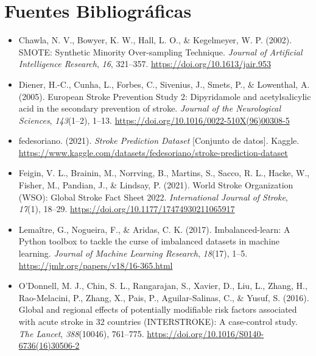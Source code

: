 \documentclass[12pt,a4paper]{article}
\begin{document}
\section{Fuentes Bibliográficas}

{\sloppy
\begin{itemize}[leftmargin=1.2cm, itemsep=0.6em, label={}]

    \item Chawla, N. V., Bowyer, K. W., Hall, L. O., \& Kegelmeyer, W. P. (2002). SMOTE: Synthetic Minority Over-sampling Technique. \textit{Journal of Artificial Intelligence Research}, \textit{16}, 321--357. \url{https://doi.org/10.1613/jair.953}

    \item Diener, H.-C., Cunha, L., Forbes, C., Sivenius, J., Smets, P., \& Lowenthal, A. (2005). European Stroke Prevention Study 2: Dipyridamole and acetylsalicylic acid in the secondary prevention of stroke. \textit{Journal of the Neurological Sciences}, \textit{143}(1--2), 1--13. \url{https://doi.org/10.1016/0022-510X(96)00308-5}

    \item fedesoriano. (2021). \textit{Stroke Prediction Dataset} [Conjunto de datos]. Kaggle. \url{https://www.kaggle.com/datasets/fedesoriano/stroke-prediction-dataset}

    \item Feigin, V. L., Brainin, M., Norrving, B., Martins, S., Sacco, R. L., Hacke, W., Fisher, M., Pandian, J., \& Lindsay, P. (2021). World Stroke Organization (WSO): Global Stroke Fact Sheet 2022. \textit{International Journal of Stroke}, \textit{17}(1), 18--29. \url{https://doi.org/10.1177/17474930211065917}

    \item Lemaître, G., Nogueira, F., \& Aridas, C. K. (2017). Imbalanced-learn: A Python toolbox to tackle the curse of imbalanced datasets in machine learning. \textit{Journal of Machine Learning Research}, \textit{18}(17), 1--5. \url{https://jmlr.org/papers/v18/16-365.html}

    \item O'Donnell, M. J., Chin, S. L., Rangarajan, S., Xavier, D., Liu, L., Zhang, H., Rao-Melacini, P., Zhang, X., Pais, P., Aguilar-Salinas, C., \& Yusuf, S. (2016). Global and regional effects of potentially modifiable risk factors associated with acute stroke in 32 countries (INTERSTROKE): A case-control study. \textit{The Lancet}, \textit{388}(10046), 761--775. \url{https://doi.org/10.1016/S0140-6736(16)30506-2}


\end{itemize}}
\end{document}
